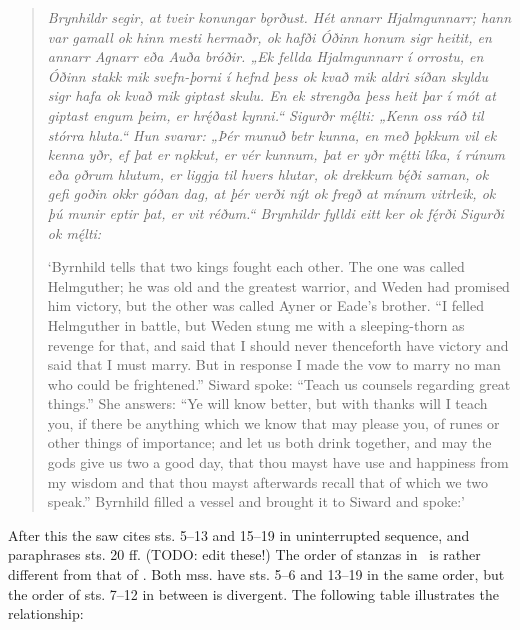 \begin{quote}
  {\small\emph{Brynhildr segir, at tveir konungar bǫrðust. Hét annarr Hjalmgunnarr; hann var gamall ok hinn mesti hermaðr, ok hafði Óðinn honum sigr heitit, en annarr Agnarr eða Auða bróðir. „Ek fellda Hjalmgunnarr í orrostu, en Óðinn stakk mik svefn-þorni í hefnd þess ok kvað mik aldri síðan skyldu sigr hafa ok kvað mik giptast skulu. En ek strengða þess heit þar í mót at giptast engum þeim, er hrę́ðast kynni.“ Sigurðr mę́lti: „Kenn oss ráð til stórra hluta.“ Hun svarar: „Þér munuð betr kunna, en með þǫkkum vil ek kenna yðr, ef þat er nǫkkut, er vér kunnum, þat er yðr mę́tti líka, í rúnum eða ǫðrum hlutum, er liggja til hvers hlutar, ok drekkum bę́ði saman, ok gefi goðin okkr góðan dag, at þér verði nýt ok fregð at mínum vitrleik, ok þú munir eptir þat, er vit réðum.“ Brynhildr fylldi eitt ker ok fę́rði Sigurði ok mę́lti:}}

  {\small ‘Byrnhild tells that two kings fought each other.  The one was called Helmguther; he was old and the greatest warrior, and Weden had promised him victory, but the other was called Ayner or Eade’s brother. “I felled Helmguther in battle, but Weden stung me with a sleeping-thorn as revenge for that, and said that I should never thenceforth have victory and said that I must marry.  But in response I made the vow to marry no man who could be frightened.” Siward spoke: “Teach us counsels regarding great things.” She answers: “Ye will know better, but with thanks will I teach you, if there be anything which we know that may please you, of runes or other things of importance; and let us both drink together, and may the gods give us two a good day, that thou mayst have use and happiness from my wisdom and that thou mayst afterwards recall that of which we two speak.” Byrnhild filled a vessel and brought it to Siward and spoke:’}
\end{quote}

After this the saw cites sts. 5–13 and 15–19 in uninterrupted sequence, and paraphrases sts. 20 ff. (TODO: edit these!)  The order of stanzas in \VolsungaMS\ is rather different from that of \Regius.  Both mss. have sts. 5–6 and 13–19 in the same order, but the order of sts. 7–12 in between is divergent.  The following table illustrates the relationship:

